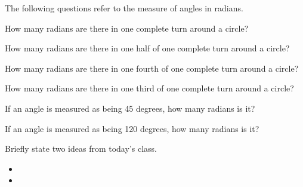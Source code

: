 \begin{problem}
\item The following questions refer to the measure of angles in
  radians.
  \begin{subproblem}
  \item How many radians are there in one complete turn around a
    circle?
    \vfill
  \item How many radians are there in one half of one complete turn
    around a circle?  
    \vfill
  \item How many radians are there in one fourth of one complete turn
    around a circle?  
    \vfill
  \item How many radians are there in one third  of one complete turn
    around a circle?  
    \vfill
  \item If an angle is measured as being 45 degrees, how many radians
    is it?
    \vfill
  \item If an angle is measured as being 120 degrees, how many radians
    is it?
    \vfill
  \end{subproblem}

\end{problem}

\postClass

\begin{problem}
\item Briefly state two ideas from today's class.
  \begin{itemize}
  \item 
  \item 
  \end{itemize}
\item 
  \begin{subproblem}
    \item
  \end{subproblem}
\end{problem}



